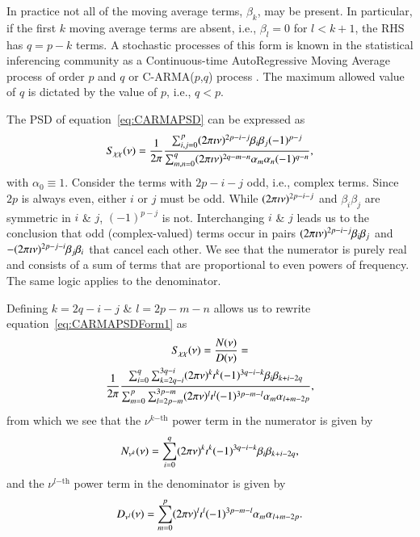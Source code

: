 \documentclass[a4paper,fleqn,usenatbib]{mnras}
\begin{document}
In practice not all of the moving average terms, $\beta_{k}$, may be present. In particular, if the first $k$ moving average terms are absent, i.e., $\beta_{l} = 0$ for $l < k+1$, the RHS has $q = p - k$ terms. A stochastic processes of this form is known in the statistical inferencing community as a Continuous-time AutoRegressive Moving Average process of order $p$ and $q$ or C-ARMA($p$,$q$) process \citep{DimensionEstimationBrockwell,HandbookOfStatistics19Brockwell,Brockwell14,Kelly14}. The maximum allowed value of $q$ is dictated by the value of $p$, i.e., $q < p$.

The PSD of equation~\eqref{eq:CARMAPSD} can be expressed as 
\begin{equation}\label{eq:CARMAPSDForm1}
S_{\chi\chi}(\nu) = \frac{1}{2 \pi }\frac{\sum_{i,j = 0}^{p} (2 \pi \imath \nu)^{2p - i -j} \beta_{i} \beta_{j} (-1)^{p - j}}{\sum_{m,n = 0}^{q} (2 \pi \imath \nu)^{2q - m -n} \alpha_{m} \alpha_{n} (-1)^{q - n}},
\end{equation}
with $\alpha_{0} \equiv 1$. Consider the terms with $2p - i - j$ odd, i.e., complex terms. Since $2p$ is always even, either $i$ or $j$ must be odd. While $(2 \pi \imath \nu)^{2p - i -j}$ and $\beta_{i} \beta_{j}$ are symmetric in $i$ \& $j$, $(-1)^{p - j}$ is not. Interchanging $i$ \& $j$ leads us to the conclusion that odd (complex-valued) terms occur in pairs $(2 \pi \imath \nu)^{2p - i -j}\beta_{i} \beta_{j}$ and $-(2 \pi \imath \nu)^{2p - j -i}\beta_{j} \beta_{i}$ that cancel each other. We see that the numerator is purely real and consists of a sum of terms that are proportional to even powers of frequency. The same logic applies to the denominator.

Defining $k = 2q - i - j$ \& $l = 2p - m - n$ allows us to rewrite equation~\eqref{eq:CARMAPSDForm1} as
\begin{multline}\label{eq:CARMAPSDForm1}
S_{\chi\chi}(\nu) = \frac{N(\nu)}{D(\nu)} = \\ \frac{1}{2 \pi } \frac{\sum_{i = 0}^{q}\sum_{k = 2q - i}^{3q - i} (2\pi\nu)^{k} \imath^{k} (-1)^{3q - i - k} \beta_{i}\beta_{k + i - 2q}}{\sum_{m = 0}^{p}\sum_{l = 2p - m}^{3p - m} (2\pi\nu)^{l} \imath^{l} (-1)^{3p - m - l} \alpha_{m}\alpha_{l + m - 2p}},
\end{multline}
from which we see that the $\nu^{k\mathrm{-th}}$ power term in the numerator is given by
\begin{equation}\label{eq:PSDNumerator}
N_{\nu^{k}}(\nu) = \sum_{i = 0}^{q} (2\pi\nu)^{k} \imath^{k} (-1)^{3q - i - k} \beta_{i}\beta_{k + i - 2q},
\end{equation}
and the $\nu^{l\mathrm{-th}}$ power term in the denominator is given by
\begin{equation}\label{eq:PSDDenominator}
D_{\nu^{l}}(\nu) = \sum_{m = 0}^{p} (2\pi\nu)^{l} \imath^{l} (-1)^{3p - m - l} \alpha_{m}\alpha_{l + m - 2p}.
\end{equation}
\end{document}

